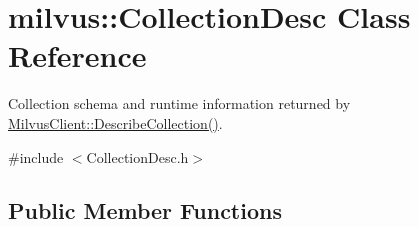 \hypertarget{classmilvus_1_1_collection_desc}{}\section{milvus\+:\+:Collection\+Desc Class Reference}
\label{classmilvus_1_1_collection_desc}


Collection schema and runtime information returned by \hyperlink{classmilvus_1_1_milvus_client_a5bdc7d4afdf9c84b7b50b4a8b4508c6e}{Milvus\+Client\+::\+Describe\+Collection()}.  




{\ttfamily \#include $<$Collection\+Desc.\+h$>$}

\subsection*{Public Member Functions}
